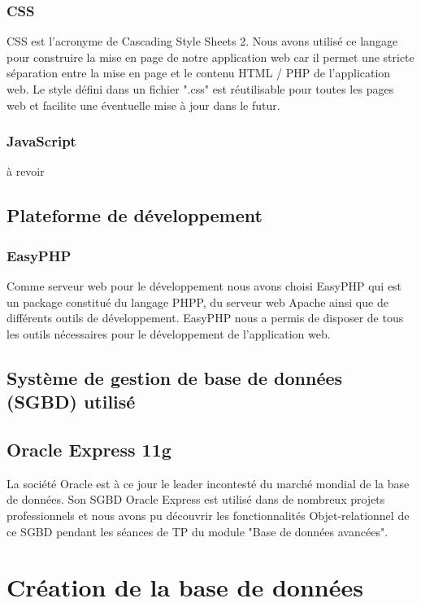 \subsubsection{CSS}
CSS est l'acronyme de Cascading Style Sheets 2. Nous avons utilisé ce langage pour construire la mise en page de notre application web car il permet une stricte séparation entre la mise en page et le contenu HTML / PHP de l'application web. Le style défini dans un fichier ".css" est réutilisable pour toutes les pages web et facilite une éventuelle mise à jour dans le futur.\\


\subsubsection{JavaScript}

à revoir

\subsection{Plateforme de développement}

\subsubsection{EasyPHP}
Comme serveur web pour le développement nous avons choisi EasyPHP qui est un package constitué du langage PHPP, du serveur web Apache ainsi que de différents outils de développement.
EasyPHP nous a permis de disposer de tous les outils nécessaires pour le développement de l'application web. 

\subsection{Système de gestion de base de données (SGBD) utilisé}

\subsection{Oracle Express 11g}

La société Oracle est à ce jour le leader incontesté du marché mondial de la base de données. Son SGBD Oracle Express est utilisé dans de nombreux projets professionnels et nous avons pu découvrir les fonctionnalités Objet-relationnel de ce SGBD pendant les séances de TP du module "Base de données avancées".


\section{Création de la base de données}

